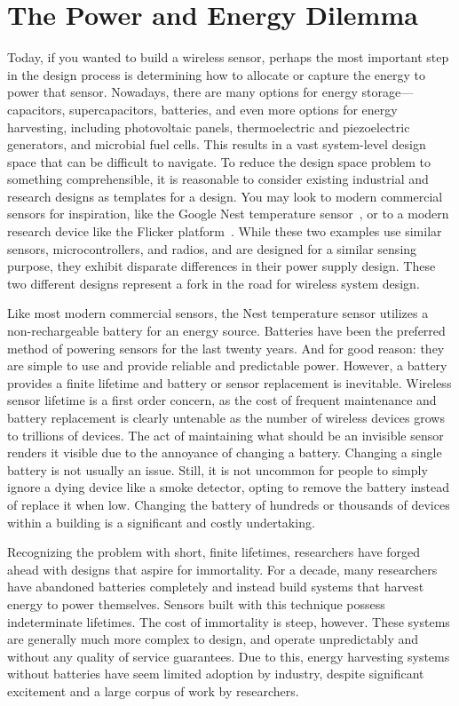 \section{The Power and Energy Dilemma}
Today, if you wanted to build a wireless sensor, perhaps the most important step in the design process is determining how to allocate or capture the energy to power that sensor. 
Nowadays, there are many options for energy storage--- capacitors, supercapacitors, batteries, and even more options for energy harvesting, including photovoltaic panels, thermoelectric and piezoelectric generators, and microbial fuel cells.
This results in a vast system-level design space that can be difficult to navigate.
To reduce the design space problem to something comprehensible, it is reasonable to consider existing industrial and research designs as templates for a design.
You may look to modern commercial sensors for inspiration, like the Google Nest temperature sensor~\cite{googleNestTemperature}, or to a modern research device like the Flicker platform~\cite{hesterFlicker17}.
While these two examples use similar sensors, microcontrollers, and radios, and are designed for a similar sensing purpose, they exhibit disparate differences in their power supply design.
These two different designs represent a fork in the road for wireless system design.

Like most modern commercial sensors, the Nest temperature sensor utilizes a non-rechargeable battery for an energy source. 
Batteries have been the preferred method of powering sensors for the last twenty years. And for good reason: they are simple to use and provide reliable and predictable power.
However, a battery provides a finite lifetime and battery or sensor replacement is inevitable.
Wireless sensor lifetime is a first order concern, as the cost of frequent maintenance and battery replacement is clearly untenable as the number of wireless devices grows to trillions of devices. 
The act of maintaining what should be an invisible sensor renders it visible due to the annoyance of changing a battery.
Changing a single battery is not usually an issue. 
Still, it is not uncommon for people to simply ignore a dying device like a smoke detector, opting to remove the battery instead of replace it when low. 
Changing the battery of hundreds or thousands of devices within a building is a significant and costly undertaking.

Recognizing the problem with short, finite lifetimes, researchers have forged ahead with designs that aspire for immortality.
For a decade, many researchers have abandoned batteries completely and instead build systems that harvest energy to power themselves. 
Sensors built with this technique possess indeterminate lifetimes. The cost of immortality is steep, however.
These systems are generally much more complex to design, and operate unpredictably and without any quality of service guarantees.
Due to this, energy harvesting systems without batteries have seem limited adoption by industry, despite significant excitement and a large corpus of work by researchers. 

